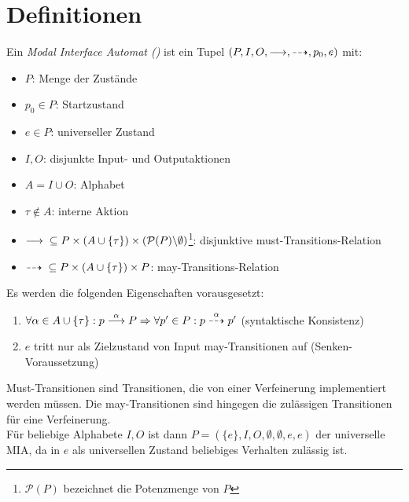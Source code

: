 \chapter{Definitionen}

\begin{Def}
  Ein \emph{Modal Interface Automat (\MIA{})} ist ein Tupel
  $(P,I,O,\must,\may,p_0,e)$ mit:
  \begin{itemize}
    \item $P$: Menge der Zustände
    \item $p_0\in P$: Startzustand
    \item $e\in P$: universeller Zustand
    \item $I,O$: disjunkte Input- und Outputaktionen
    \item $A = I\cup O$: Alphabet
    \item $\tau\notin A$: interne Aktion
    \item $\must{} \subseteq P\times (A\cup\{\tau\})\times
      (\mathcal{P}(P)\backslash\emptyset )$\footnote{$\mathcal{P}(P)$
      bezeichnet die Potenzmenge von $P$}: disjunktive
      must-Transitions-Relation
    \item $\may{} \subseteq P\times (A\cup\{\tau\})\times
      P$: may-Transitions-Relation
  \end{itemize}
  Es werden die folgenden Eigenschaften vorausgesetzt:
  \begin{enumerate}
    \item $\forall\alpha\in A\cup\{\tau\}:p\must[\alpha]P
      \Rightarrow\forall p'\in P:p\may[\alpha]p'$
      (syntaktische Konsistenz)
    \item $e$ tritt nur als Zielzustand von Input may-Transitionen auf
      (Senken-Voraussetzung) 
  \end{enumerate}
\end{Def}

Must-Transitionen sind Transitionen, die von einer Verfeinerung implementiert
werden müssen. Die may-Transitionen sind hingegen die zulässigen Transitionen
für eine Verfeinerung.\\
Für beliebige Alphabete $I,O$ ist dann $P=(\{e\},I,O,\emptyset ,\emptyset,
e,e)$ der universelle MIA, da in $e$ als universellen Zustand beliebiges
Verhalten zulässig ist.\\

